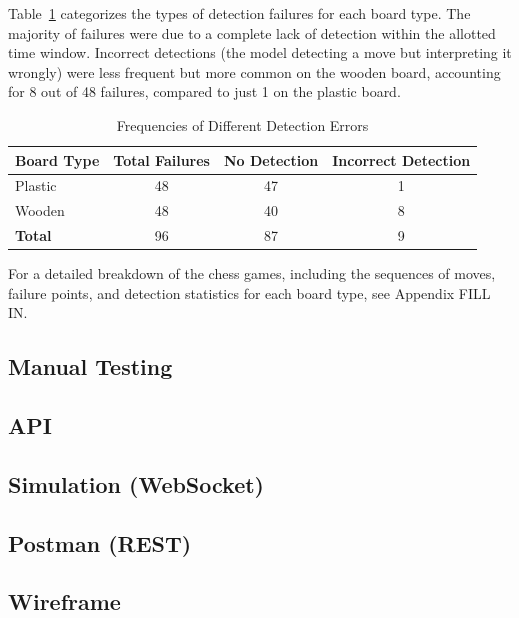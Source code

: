 Table~\ref{tab:different-errors} categorizes the types of detection failures for each board type. The majority of failures were due to a complete lack of detection within the allotted time window. Incorrect detections (the model detecting a move but interpreting it wrongly) were less frequent but more common on the wooden board, accounting for 8 out of 48 failures, compared to just 1 on the plastic board.  \\

\begin{table}[htbp]
\centering
\caption{Frequencies of Different Detection Errors}
\label{tab:different-errors}
\begin{tabular}{lccc}
\toprule
\textbf{Board Type} & \textbf{Total Failures} & \textbf{No Detection} & \textbf{Incorrect Detection} \\
\midrule
Plastic & 48 & 47 & 1 \\
Wooden & 48 & 40 & 8 \\
\midrule
\textbf{Total} & 96 & 87 & 9 \\
\bottomrule
\end{tabular}
\end{table}

For a detailed breakdown of the chess games, including the sequences of moves, failure points, and detection statistics for each board type, see Appendix FILL IN.

\subsection{Manual Testing}

\subsection{API}

\subsection{Simulation (WebSocket)}

\subsection{Postman (REST)}

\subsection{Wireframe}
\label{subsec:wireframe-results}

